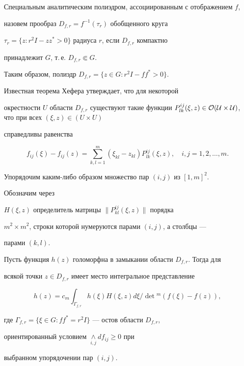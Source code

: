  


\begin{defn} 


Специальным аналитическим полиэдром, ассоциированным с отображением $f$, 


назовем прообраз $D_{f,r}=f^{-1}(\tau_r)$ обобщенного круга 


$\tau_r=\{z:r^2I-z z^*>0\}$ радиуса $r$, если $D_{f,r}$ компактно 


принадлежит $G$, т.\,е. $D_{f,r}\Subset G$. 


\end{defn} 


 


Таким образом, полиэдр $D_{f,r}=\{z\in G:r^2I-f f^*>0\}$. 


 


Известная теорема Хефера \cite{3} утверждает, что для некоторой 


окрестности $U$ области $D_{f,r}$ существуют такие функции $P_{l 


k}^{i j}(\xi,z)\in\cal O(U\times U)$, что при всех $(\xi,z)\in(U\times U)$ 


справедливы равенства 


$$ 


f_{i j}(\xi)-f_{i j}(z)=\sum^m_{k,l=1} 


(\xi_{k l}-z_{k l})P^{i j}_{l k}(\xi,z),\quad 


i,j=1,2,\dotsc,m. 


$$ 


 


Упорядочим каким-либо образом множество пар $(i,j)$ из $[1,m]^2$. 


Обозначим через 


$H(\xi,z)$ определитель матрицы $\|P^{i j}_{k l}(\xi,z)\|$ порядка 


$m^2\times m^2$, строки которой нумеруются парами $(i,j)$, а столбцы --- 


парами $(k,l)$. 


 


\begin{thm} 


Пусть функция $h(z)$ голоморфна в замыкании области $D_{f,r}$. Тогда для 


всякой точки $z\in D_{f,r}$ имеет место интегральное представление 


\begin{equation} 


h(z)=c_m\int_{\Gamma_{f,r}}h(\xi)H(\xi,z)d\xi 


/\det{}^m(f(\xi)-f(z)), 


\end{equation} 


где $\Gamma_{f,r}=\{\xi\in G:f f^*=r^2I\}$ --- остов области $D_{f,r}$, 


ориентированный условием $\underset{i,j}{\wedge}{}d f_{i j}\ge0$ при 


выбранном упорядочении пар $(i,j)$. 


\end{thm} 


